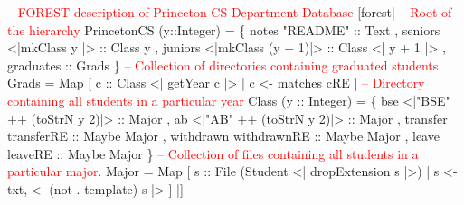 \begin{code}
\textcolor{red}{-- FOREST description of Princeton CS Department Database}
[forest|
  \textcolor{red}{-- Root of the hierarchy}
   PrincetonCS (y::Integer) = 
    \{ notes  "README" :: Text
    , seniors    <|mkClass y      |> :: Class y
    , juniors    <|mkClass (y + 1)|> :: Class <| y + 1 |>
    , graduates :: Grads
    \}
\mbox{}
  \textcolor{red}{-- Collection of directories containing graduated students}
   Grads = 
     Map [ c :: Class <| getYear c |> | c <- matches cRE ] 
\mbox{}
  \textcolor{red}{-- Directory containing all students in a particular year}
   Class (y :: Integer) = 
    \{ bse  <|"BSE" ++ (toStrN y 2)|> :: Major
    , ab   <|"AB"  ++ (toStrN y 2)|> :: Major   
    , transfer   transferRE  :: Maybe Major 
    , withdrawn  withdrawnRE :: Maybe Major 
    , leave      leaveRE     :: Maybe Major 
    \}
\mbox{}
  \textcolor{red}{-- Collection of files containing all students in a particular major.}
   Major = Map 
    [ s :: File (Student <| dropExtension s |>) 
    | s <-  txt,  <| (not . template) s |>  ]  
|]

\end{code}